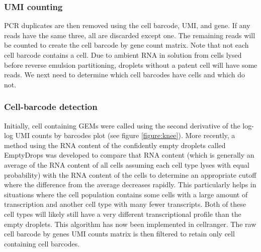 \subsubsection{UMI counting}

\par{
PCR duplicates are then removed using the cell barcode, UMI, and gene. If any reads have the same three, all are discarded except one. The remaining reads will be counted to create the cell barcode by gene count matrix. Note that not each cell barcode contains a cell. Due to ambient RNA in solution from cells lysed before reverse emulsion partitioning, droplets without a patent cell will have some reads. We next need to determine which cell barcodes have cells and which do not.
}



\subsubsection{Cell-barcode detection}
\par{
Initially, cell containing GEMs were called using the second derivative of the log-log UMI counts by barcodes plot (see figure \ref{figure:knee}). More recently, a method using the RNA content of the confidently empty droplets called EmptyDrops\cite{emptydrops} was developed to compare that RNA content (which is generally an average of the RNA content of all cells assuming each cell type lyses with equal probability) with the RNA content of the cells to determine an appropriate cutoff where the difference from the average decreases rapidly. This particularly helps in situations where the cell population contains some cells with a large amount of transcription and another cell type with many fewer transcripts. Both of these cell types will likely still have a very different transcriptional profile than the empty droplets. This algorithm has now been implemented in cellranger. The raw cell barcode by genes UMI counts matrix is then filtered to retain only cell containing cell barcodes.
}
